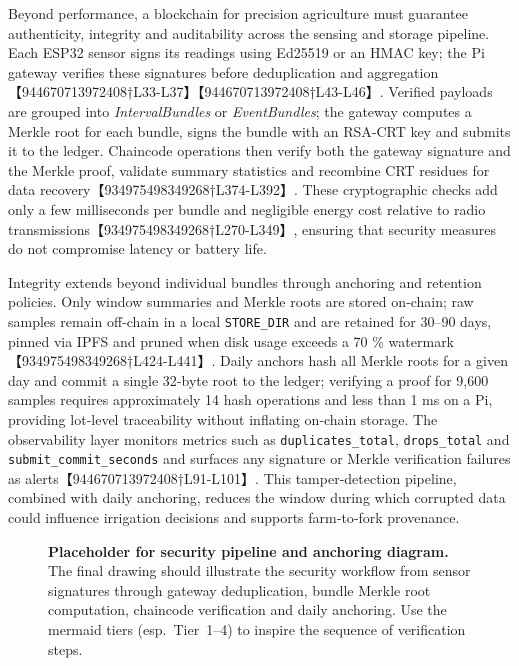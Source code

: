 Beyond performance, a blockchain for precision agriculture must guarantee authenticity, integrity and auditability across the sensing and storage pipeline.  Each ESP32 sensor signs its readings using Ed25519 or an HMAC key; the Pi gateway verifies these signatures before deduplication and aggregation【944670713972408†L33-L37】【944670713972408†L43-L46】.  Verified payloads are grouped into \emph{IntervalBundles} or \emph{EventBundles}; the gateway computes a Merkle root for each bundle, signs the bundle with an RSA‑CRT key and submits it to the ledger.  Chaincode operations then verify both the gateway signature and the Merkle proof, validate summary statistics and recombine CRT residues for data recovery【934975498349268†L374-L392】.  These cryptographic checks add only a few milliseconds per bundle and negligible energy cost relative to radio transmissions【934975498349268†L270-L349】, ensuring that security measures do not compromise latency or battery life.

Integrity extends beyond individual bundles through anchoring and retention policies.  Only window summaries and Merkle roots are stored on‑chain; raw samples remain off‑chain in a local \texttt{STORE\_DIR} and are retained for 30–90 days, pinned via IPFS and pruned when disk usage exceeds a 70 \% watermark【934975498349268†L424-L441】.  Daily anchors hash all Merkle roots for a given day and commit a single 32‑byte root to the ledger; verifying a proof for 9,600 samples requires approximately 14 hash operations and less than 1 ms on a Pi, providing lot‑level traceability without inflating on‑chain storage.  The observability layer monitors metrics such as \texttt{duplicates\_total}, \texttt{drops\_total} and \texttt{submit\_commit\_seconds} and surfaces any signature or Merkle verification failures as alerts【944670713972408†L91-L101】.  This tamper‑detection pipeline, combined with daily anchoring, reduces the window during which corrupted data could influence irrigation decisions and supports farm‑to‑fork provenance.

\begin{figure}[h]
  \centering
  \caption{\textbf{Placeholder for security pipeline and anchoring diagram.}  The final drawing should illustrate the security workflow from sensor signatures through gateway deduplication, bundle Merkle root computation, chaincode verification and daily anchoring.  Use the mermaid tiers (esp.~Tier~1–4) to inspire the sequence of verification steps.}
  \label{fig:security-pipeline}
\end{figure}

